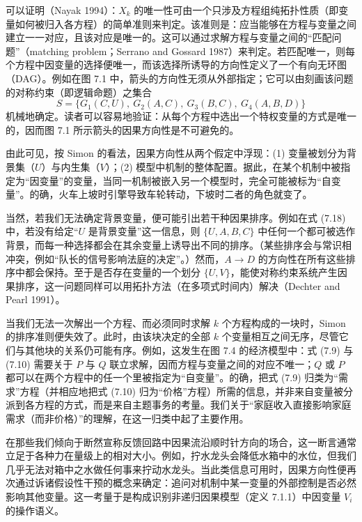 可以证明（Nayak 1994）：$X_k$ 的唯一性可由一个只涉及方程组纯拓扑性质（即变量如何被归入各方程）的简单准则来判定。该准则是：应当能够在方程与变量之间建立一一对应，且该对应是唯一的。这可以通过求解方程与变量之间的“匹配问题”（matching problem；Serrano and Gossard 1987）来判定。若匹配唯一，则每个方程中因变量的选择便唯一，而该选择所诱导的方向性定义了一个有向无环图（DAG）。例如在图 7.1 中，箭头的方向性无须从外部指定；它可以由刻画该问题的对称约束（即逻辑命题）之集合
\begin{equation}
S=\{G_1(C,U),\ G_2(A,C),\ G_3(B,C),\ G_4(A,B,D)\} \tag{7.18}
\end{equation}
机械地确定。读者可以容易地验证：从每个方程中选出一个特权变量的方式是唯一的，因而图 7.1 所示箭头的因果方向性是不可避免的。

由此可见，按 Simon 的看法，因果方向性从两个假定中浮现：(1) 变量被划分为背景集（$U$）与内生集（$V$）；(2) 模型中机制的整体配置。据此，在某个机制中被指定为“因变量”的变量，当同一机制被嵌入另一个模型时，完全可能被标为“自变量”。的确，火车上坡时引擎导致车轮转动，下坡时二者的角色就变了。

当然，若我们无法确定背景变量，便可能引出若干种因果排序。例如在式 \textup{(7.18)} 中，若没有给定“$U$ 是背景变量”这一信息，则 $\{U,A,B,C\}$ 中任何一个都可被选作背景，而每一种选择都会在其余变量上诱导出不同的排序。（某些排序会与常识相冲突，例如“队长的信号影响法庭的决定”。）然而，$A\to D$ 的方向性在所有这些排序中都会保持。至于是否存在变量的一个划分 $\{U,V\}$，能使对称约束系统产生因果排序，这一问题同样可以用拓扑方法（在多项式时间内）解决（Dechter and Pearl 1991）。

当我们无法一次解出一个方程、而必须同时求解 $k$ 个方程构成的一块时，Simon 的排序准则便失效了。此时，由该块决定的全部 $k$ 个变量相互之间无序，尽管它们与其他块的关系仍可能有序。例如，这发生在图 7.4 的经济模型中：式 \textup{(7.9)} 与 \textup{(7.10)} 需要关于 $P$ 与 $Q$ 联立求解，因而方程与变量之间的对应不唯一；$Q$ 或 $P$ 都可以在两个方程中的任一个里被指定为“自变量”。的确，把式 \textup{(7.9)} 归类为“需求”方程（并相应地把式 \textup{(7.10)} 归为“价格”方程）所需的信息，并非来自变量被分派到各方程的方式，而是来自主题事务的考量。我们关于“家庭收入直接影响家庭需求（而非价格）”的理解，在这一归类中起了主要作用。

在那些我们倾向于断然宣称反馈回路中因果流沿顺时针方向的场合，这一断言通常立足于各种力在量级上的相对大小。例如，拧水龙头会降低水箱中的水位，但我们几乎无法对箱中之水做任何事来拧动水龙头。当此类信息可用时，因果方向性便再次通过诉诸假设性干预的概念来确定：追问对机制中某一变量的外部控制是否必然影响其他变量。这一考量于是构成识别非递归因果模型（定义 7.1.1）中因变量 $V_i$ 的操作语义。

